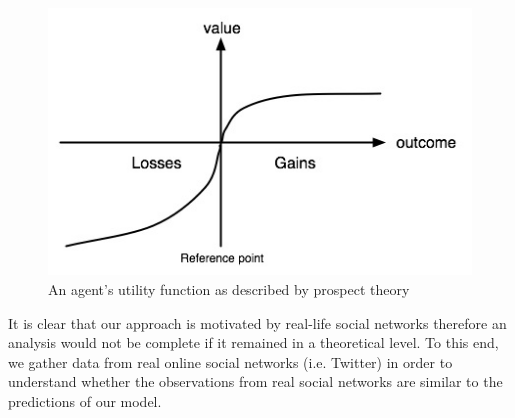 \documentclass[A4paper,11pt]{article}
\begin{document}
\begin{figure}[h!]
  \centering
  \includegraphics[width=.35\linewidth]{./Valuefun.jpg}
  \caption{An agent's utility function as described by prospect theory}
  \label{fig:prospect-util}
\end{figure}

\par It is clear that our approach is motivated by real-life social networks therefore an analysis would not be complete
if it remained in a theoretical level. To this end, we gather data from real online social networks (i.e. Twitter) in
order to understand whether the observations from real social networks are similar to the predictions of our model.

\label{Bibliography}




\end{document}
